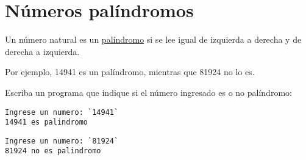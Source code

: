 \section{Números palíndromos}

Un número natural es un
\href{http://es.wikipedia.org/wiki/Pal\%C3\%ADndromo}{palíndromo} si se
lee igual de izquierda a derecha y de derecha a izquierda.

Por ejemplo, 14941 es un palíndromo, mientras que 81924 no lo es.

Escriba un programa que indique si el número ingresado es o no
palíndromo:

\begin{lstlisting}[language=testcase]
Ingrese un numero: `14941`
14941 es palindromo
\end{lstlisting}

\begin{lstlisting}[language=testcase]
Ingrese un numero: `81924`
81924 no es palindromo
\end{lstlisting}

